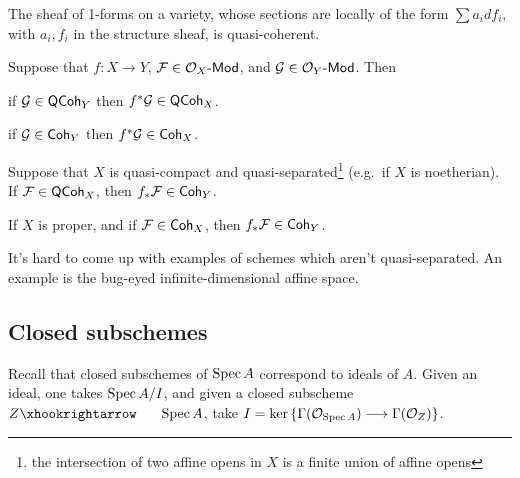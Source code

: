 \documentclass[11pt]{article}
\begin{document}
\begin{Nov1}
\begin{exmp*}
The sheaf of 1-forms on a variety, whose sections are locally of the form $\sum a_i df_i$, with $a_i,f_i$ in the structure sheaf, is quasi-coherent.
\end{exmp*}
\begin{prop*}
Suppose that $f:X\to Y$,  $\mathcal{F}\in\mathcal{O}_X\operatorname{{\mathsf{\!-Mod}}}$, and $\mathcal{G}\in\mathcal{O}_Y\operatorname{{\mathsf{\!-Mod}}}$.
Then
\begin{itemise}
\item if $\mathcal{G}\in\operatorname{{\mathsf{QCoh}}}_Y$ then $f^*\mathcal{G}\in\operatorname{{\mathsf{QCoh}}}_X$.
\item if $\mathcal{G}\in\operatorname{{\mathsf{Coh}}}_Y$ then $f^*\mathcal{G}\in\operatorname{{\mathsf{Coh}}}_X$.
\item Suppose that $X$ is quasi-compact and quasi-separated\footnote{the intersection of two affine opens in $X$ is a finite union of affine opens} (e.g.\ if $X$ is noetherian). If $\mathcal{F}\in\operatorname{{\mathsf{QCoh}}}_X$, then $f_*\mathcal{F}\in\operatorname{{\mathsf{Coh}}}_Y$.
\item If $X$ is proper, and if $\mathcal{F}\in\operatorname{{\mathsf{Coh}}}_X$, then $f_*\mathcal{F}\in\operatorname{{\mathsf{Coh}}}_Y$.
\end{itemise}
\end{prop*}
\begin{fact*}
It's hard to come up with examples of schemes which aren't quasi-separated. An example is the bug-eyed infinite-dimensional affine space.
\end{fact*}
\subsection*{Closed subschemes}
Recall that closed subschemes of $\operatorname{Spec} A$ correspond to ideals of $A$. Given an ideal, one takes $\operatorname{Spec} A/I$, and given a closed subscheme $Z\cofibration \spec A$, take $I=\textup{ker}\,\{\Gamma(\mathcal{O}_{\operatorname{Spec} A})\longrightarrow\Gamma(\mathcal{O}_Z)\}$.


\end{Nov1}
\end{document}
